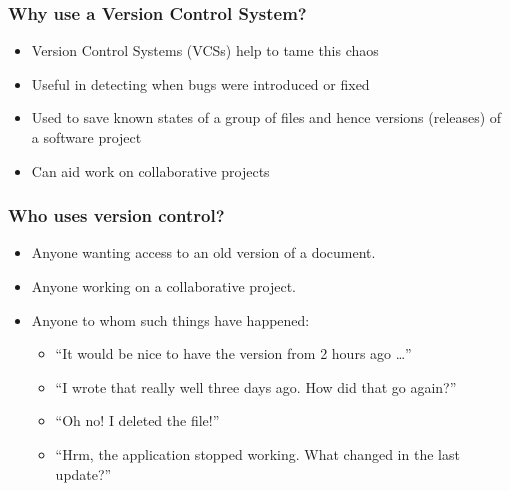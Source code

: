 \begin{frame}
\frametitle{Why use a Version Control System?}
\begin{itemize}
    \item Version Control Systems (VCSs) help to tame this chaos
    \item Useful in detecting when bugs were introduced or fixed
    \item Used to save known states of a group of files and hence versions
        (releases) of a software project
    \item Can aid work on collaborative projects
\end{itemize}
\end{frame}

\begin{frame}
\frametitle{Who uses version control?}
\begin{itemize}
    \item Anyone wanting access to an old version of a document.
    \item Anyone working on a collaborative project.
    \item Anyone to whom such things have happened:
        \begin{itemize}
            \item ``It would be nice to have the version from 2 hours ago \ldots''
            \item ``I wrote that really well three days ago.  How did that
                go again?''
            \item ``Oh no!  I deleted the file!''
            \item ``Hrm, the application stopped working.  What changed in the
                last update?''
        \end{itemize}
\end{itemize}
\end{frame}

